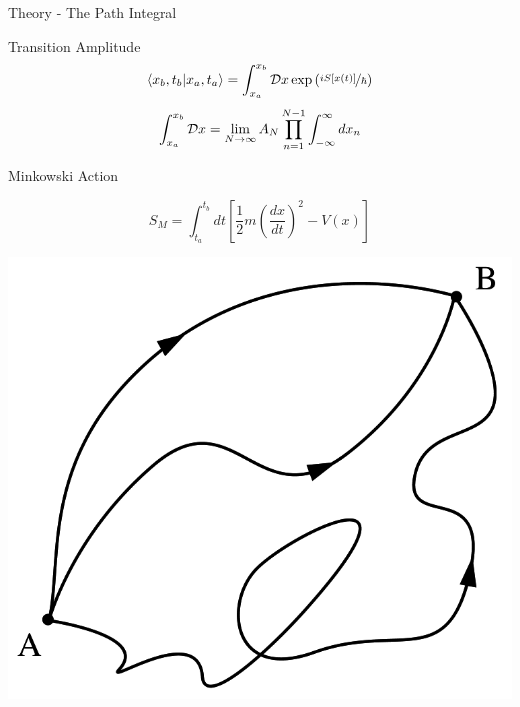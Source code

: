 \documentclass{beamer}
\begin{document}
\begin{frame}{Theory - The Path Integral}
    {
       \begin{block}{Transition Amplitude}
            {
                \begin{equation}
                    \braket{x_b,t_b|x_a,t_a} = \int^{x_b}_{x_a} {\cal D}{x} \exp{\left(\nicefrac{iS\left[{x\left(t\right)}\right]}{\hbar}\right)}
                \end{equation}
            }
            {
                \begin{equation}
                \int^{x_b}_{x_a} {\cal D}{x} = \lim_{N \to \infty} A_N \prod_{n=1}^{N-1} \int^{\infty}_{- \infty} d x_n
                \end{equation}
            }
        \end{block}
    }
    {
        \begin{block}{Minkowski Action}
            
            \begin{equation}
                    S_{M} = \int^{t_b}_{t_a}dt \left[\frac{1}{2}m\left(\frac{dx}{dt}\right)^2 - V(x)\right]
            \end{equation}
            
        \end{block}
    }
    {
        \centering
        \includegraphics[scale=0.2]{DataForPresentation/PathIntegralSmooth.png}
    }
\end{frame}
\end{document}
